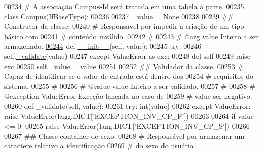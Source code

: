 \begin{DoxyCode}
00234 \textcolor{comment}{#   A associação Campus-Id será tratada em uma tabela à parte.}
\hypertarget{BaseUnit_8py_source_l00235}{}\hyperlink{classELO_1_1BaseUnit_1_1Campus}{00235} \textcolor{keyword}{class }\hyperlink{classELO_1_1BaseUnit_1_1Campus}{Campus}(\hyperlink{classELO_1_1BaseUnit_1_1IfBaseType}{IfBaseType}):
00236 
00237     \_value = \textcolor{keywordtype}{None}
00238 
00239     \textcolor{comment}{## Construtor da classe.}
00240     \textcolor{comment}{#   Responsável por impedir a criação de um tipo básico com}
00241     \textcolor{comment}{#   conteúdo inválido.}
00242     \textcolor{comment}{#}
00243     \textcolor{comment}{#   @arg value Inteiro a ser armazenado.}
\hypertarget{BaseUnit_8py_source_l00244}{}\hyperlink{classELO_1_1BaseUnit_1_1Campus_ac16ebb4409f821d7787fe9127306b1d0}{00244}     \textcolor{keyword}{def }\hyperlink{classELO_1_1BaseUnit_1_1Campus_ac16ebb4409f821d7787fe9127306b1d0}{\_\_init\_\_}(self, value):
00245         \textcolor{keywordflow}{try}:
00246             self.\hyperlink{classELO_1_1BaseUnit_1_1IfBaseType_acf84c5906a39b605a23ab68c4ca1dd19}{\_validate}(value)
00247         \textcolor{keywordflow}{except} ValueError \textcolor{keyword}{as} exc:
00248             del self
00249             \textcolor{keywordflow}{raise} exc
00250         self.\hyperlink{classELO_1_1BaseUnit_1_1IfBaseType_ad05d9d377fc4b99743c022cc8f6019d7}{\_value} = value
00251 
00252     \textcolor{comment}{## Validador da classe.}
00253     \textcolor{comment}{#   Capaz de identificar se o valor de entrada está dentro dos}
00254     \textcolor{comment}{#   requisitos do sistema.}
00255     \textcolor{comment}{#}
00256     \textcolor{comment}{#   @value      value       Inteiro a ser validado.}
00257     \textcolor{comment}{#}
00258     \textcolor{comment}{#   @exception  ValueError  Exceção lançada no caso de}
00259     \textcolor{comment}{#                           value ser negativo.}
00260     \textcolor{keyword}{def }\_validate(self, value):
00261         \textcolor{keywordflow}{try}: int(value)
00262         \textcolor{keywordflow}{except} ValueError: \textcolor{keywordflow}{raise} ValueError(lang.DICT[\textcolor{stringliteral}{'EXCEPTION\_INV\_CP\_F'}])
00263 
00264         \textcolor{keywordflow}{if} value <= 0:
00265             \textcolor{keywordflow}{raise} ValueError(lang.DICT[\textcolor{stringliteral}{'EXCEPTION\_INV\_CP\_S'}])
00266 
00267 \textcolor{comment}{## Classe container de sexo.}
00268 \textcolor{comment}{#   Responsável por armazenar um caractere relativo a identificação}
00269 \textcolor{comment}{#   do sexo do usuário.}

\end{DoxyCode}
